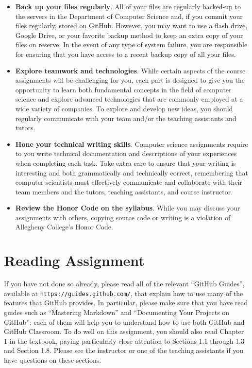 \documentclass[11pt]{article}
\newcommand{\url}[1]{\lstinline{#1}}
\begin{document}
\begin{itemize}
\item {\bf Back up your files regularly}. All of your files are regularly backed-up to the servers in the Department of
  Computer Science and, if you commit your files regularly, stored on GitHub. However, you may want to use a flash
  drive, Google Drive, or your favorite backup method to keep an extra copy of your files on reserve. In the event of
  any type of system failure, you are responsible for ensuring that you have access to a recent backup copy of all your
  files.

\item {\bf Explore teamwork and technologies}. While certain aspects of the course assignments will be challenging
  for you, each part is designed to give you the opportunity to learn both fundamental concepts in the field of computer
  science and explore advanced technologies that are commonly employed at a wide variety of companies. To explore and
  develop new ideas, you should regularly communicate with your team and/or the teaching assistants and tutors.

\item {\bf Hone your technical writing skills}. Computer science assignments require to you write technical
  documentation and descriptions of your experiences when completing each task. Take extra care to ensure that your
  writing is interesting and both grammatically and technically correct, remembering that computer scientists must
  effectively communicate and collaborate with their team members and the tutors, teaching assistants, and course
  instructor.

\item {\bf Review the Honor Code on the syllabus}. While you may discuss your assignments with others, copying source
  code or writing is a violation of Allegheny College's Honor Code.

\end{itemize}

\section*{Reading Assignment}

If you have not done so already, please read all of the relevant ``GitHub
Guides'', available at \url{https://guides.github.com/}, that explain how to
use many of the features that GitHub provides. In particular, please make sure
that you have read guides such as ``Mastering Markdown'' and ``Documenting Your
Projects on GitHub''; each of them will help you to understand how to use both
GitHub and GitHub Classroom. To do well on this assignment, you should also
read Chapter 1 in the textbook, paying particularly close attention to Sections
1.1 through 1.3 and Section 1.8. Please see the instructor or one of the
teaching assistants if you have questions on these sections.
\end{document}

